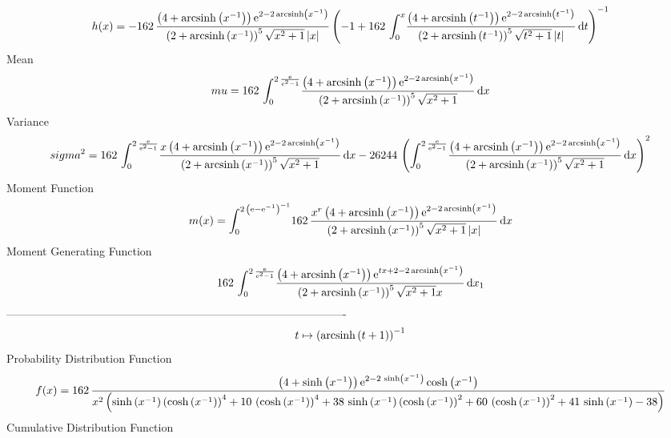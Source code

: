 \documentclass[12pt]{article}
\begin{document}
 $$ h(x)=-162\,{\frac { \left( 4+{\rm arcsinh} \left({x}^{-1}\right) \right) {
{\rm e}^{2-2\,{\rm arcsinh} \left({x}^{-1}\right)}}}{ \left( 2+
{\rm arcsinh} \left({x}^{-1}\right) \right) ^{5}\sqrt {{x}^{2}+1}
 \left| x \right| } \left( -1+162\,\int_{0}^{x}\!{\frac { \left( 4+
{\rm arcsinh} \left({t}^{-1}\right) \right) {{\rm e}^{2-2\,
{\rm arcsinh} \left({t}^{-1}\right)}}}{ \left( 2+{\rm arcsinh} \left({
t}^{-1}\right) \right) ^{5}\sqrt {{t}^{2}+1} \left| t \right| }}
\,{\rm d}t \right) ^{-1}}
$$Mean 
 $$ mu=162\,\int_{0}^{2\,{\frac {{\rm e}}{{{\rm e}^{2}}-1}}}\!{\frac {
 \left( 4+{\rm arcsinh} \left({x}^{-1}\right) \right) {{\rm e}^{2-2\,
{\rm arcsinh} \left({x}^{-1}\right)}}}{ \left( 2+{\rm arcsinh} \left({
x}^{-1}\right) \right) ^{5}\sqrt {{x}^{2}+1}}}\,{\rm d}x
$$ Variance 
 $$ sigma^2 = 162\,\int_{0}^{2\,{\frac {{\rm e}}{{{\rm e}^{2}}-1}}}\!{\frac {x
 \left( 4+{\rm arcsinh} \left({x}^{-1}\right) \right) {{\rm e}^{2-2\,
{\rm arcsinh} \left({x}^{-1}\right)}}}{ \left( 2+{\rm arcsinh} \left({
x}^{-1}\right) \right) ^{5}\sqrt {{x}^{2}+1}}}\,{\rm d}x-26244\,
 \left( \int_{0}^{2\,{\frac {{\rm e}}{{{\rm e}^{2}}-1}}}\!{\frac {
 \left( 4+{\rm arcsinh} \left({x}^{-1}\right) \right) {{\rm e}^{2-2\,
{\rm arcsinh} \left({x}^{-1}\right)}}}{ \left( 2+{\rm arcsinh} \left({
x}^{-1}\right) \right) ^{5}\sqrt {{x}^{2}+1}}}\,{\rm d}x \right) ^{2}
$$Moment Function 
 $$ m(x) = \int_{0}^{2\, \left( {\rm e}-{{\rm e}^{-1}} \right) ^{-1}}\!162\,{
\frac {{x}^{r} \left( 4+{\rm arcsinh} \left({x}^{-1}\right) \right) {
{\rm e}^{2-2\,{\rm arcsinh} \left({x}^{-1}\right)}}}{ \left( 2+
{\rm arcsinh} \left({x}^{-1}\right) \right) ^{5}\sqrt {{x}^{2}+1}
 \left| x \right| }}\,{\rm d}x
$$ Moment Generating Function 
 $$162\,\int_{0}^{2\,{\frac {{\rm e}}{{{\rm e}^{2}}-1}}}\!{\frac {
 \left( 4+{\rm arcsinh} \left({x}^{-1}\right) \right) {{\rm e}^{tx+2-2
\,{\rm arcsinh} \left({x}^{-1}\right)}}}{ \left( 2+{\rm arcsinh} 
\left({x}^{-1}\right) \right) ^{5}\sqrt {{x}^{2}+1}x}}\,{\rm d}x_{{1}}
$$-------------------------------------------------------------------------------------------  \\$$t\mapsto  \left( {\rm arcsinh} \left(t+1\right) \right) ^{-1}
$$Probability Distribution Function 
$$  f(x)=162\,{\frac { \left( 4+\sinh \left( {x}^{-1} \right)  \right) {{\rm e}
^{2-2\,\sinh \left( {x}^{-1} \right) }}\cosh \left( {x}^{-1} \right) 
}{{x}^{2} \left( \sinh \left( {x}^{-1} \right)  \left( \cosh \left( {x
}^{-1} \right)  \right) ^{4}+10\, \left( \cosh \left( {x}^{-1}
 \right)  \right) ^{4}+38\,\sinh \left( {x}^{-1} \right)  \left( \cosh
 \left( {x}^{-1} \right)  \right) ^{2}+60\, \left( \cosh \left( {x}^{-
1} \right)  \right) ^{2}+41\,\sinh \left( {x}^{-1} \right) -38
 \right) }}
$$Cumulative Distribution Function  
\end{document}
